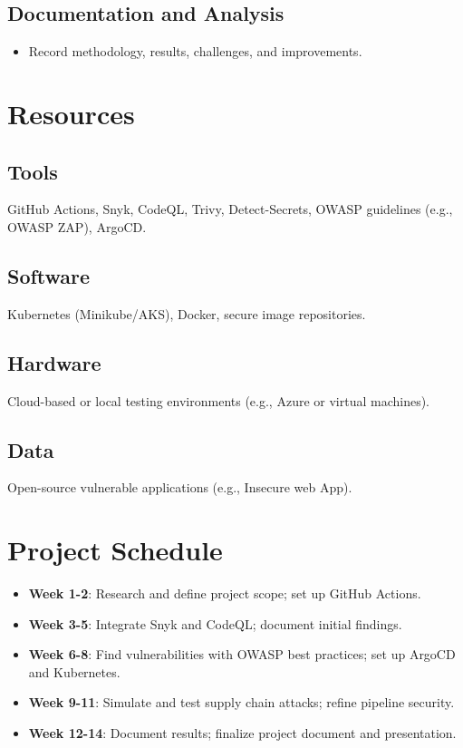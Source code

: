 \documentclass[conference]{IEEEtran}
\begin{document}
\subsection{Documentation and Analysis}
\begin{itemize}
    \item Record methodology, results, challenges, and improvements.
\end{itemize}

\section{Resources}
\subsection{Tools}
GitHub Actions, Snyk, CodeQL, Trivy, Detect-Secrets, OWASP guidelines (e.g., OWASP ZAP), ArgoCD.

\subsection{Software}
Kubernetes (Minikube/AKS), Docker, secure image repositories.

\subsection{Hardware}
Cloud-based or local testing environments (e.g., Azure or virtual machines).

\subsection{Data}
Open-source vulnerable applications (e.g., Insecure web App).

\section{Project Schedule}
\begin{itemize}
    \item \textbf{Week 1-2}: Research and define project scope; set up GitHub Actions.
    \item \textbf{Week 3-5}: Integrate Snyk and CodeQL; document initial findings.
    \item \textbf{Week 6-8}: Find vulnerabilities with OWASP best practices; set up ArgoCD and Kubernetes.
    \item \textbf{Week 9-11}: Simulate and test supply chain attacks; refine pipeline security.
    \item \textbf{Week 12-14}: Document results; finalize project document and presentation.
\end{itemize}
\end{document}
